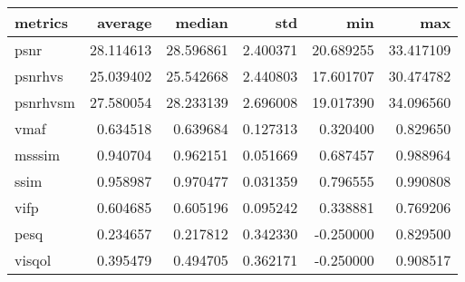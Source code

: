 \begin{tabular}{lrrrrr}
\toprule
metrics & average & median & std & min & max \\
\midrule
psnr & 28.114613 & 28.596861 & 2.400371 & 20.689255 & 33.417109 \\
psnrhvs & 25.039402 & 25.542668 & 2.440803 & 17.601707 & 30.474782 \\
psnrhvsm & 27.580054 & 28.233139 & 2.696008 & 19.017390 & 34.096560 \\
vmaf & 0.634518 & 0.639684 & 0.127313 & 0.320400 & 0.829650 \\
msssim & 0.940704 & 0.962151 & 0.051669 & 0.687457 & 0.988964 \\
ssim & 0.958987 & 0.970477 & 0.031359 & 0.796555 & 0.990808 \\
vifp & 0.604685 & 0.605196 & 0.095242 & 0.338881 & 0.769206 \\
pesq & 0.234657 & 0.217812 & 0.342330 & -0.250000 & 0.829500 \\
visqol & 0.395479 & 0.494705 & 0.362171 & -0.250000 & 0.908517 \\
\bottomrule
\end{tabular}
